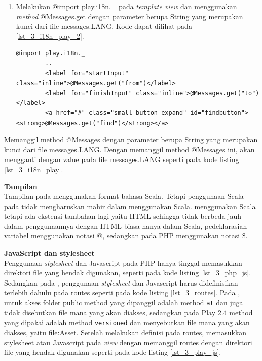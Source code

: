 \documentclass[a4paper,twoside]{article}
\begin{document}
\begin{enumerate}
\begin{enumerate}
	
	\item Melakukan @import play.i18n.\_ pada \textit{template view} dan menggunakan \textit{method} @Messages.get dengan parameter berupa String yang merupakan kunci dari file messages.LANG. Kode dapat dilihat pada \ref{lst_3_i18n_play_2}.
	
		\begin{lstlisting}[caption=Script \play untuk Internationalization,label = {lst_3_i18n_play_2}]
		@import play.i18n._
		..
		<label for="startInput" class="inline">@Messages.get("from")</label>
		<label for="finishInput" class="inline">@Messages.get("to")</label>
		<a href="#" class="small button expand" id="findbutton"><strong>@Messages.get("find")</strong></a>
	\end{lstlisting}
	
\end{enumerate}

Memanggil method @Messages dengan parameter berupa String yang merupakan kunci dari file messages.LANG. Dengan memanggil method @Messages ini, akan mengganti dengan value pada file messages.LANG seperti pada kode listing \ref{lst_3_i18n_play}.

\textbf{Tampilan}\\
Tampilan pada \play menggunakan format bahasa Scala. Tetapi penggunaan Scala pada \play tidak mengharuskan mahir dalam menggunakan Scala. \play menggunakan Scala tetapi ada ekstensi tambahan lagi yaitu HTML sehingga tidak berbeda jauh dalam penggunaannya dengan HTML biasa hanya dalam Scala, pedeklarasian variabel menggunakan notasi @, sedangkan pada PHP menggunakan notasi \$.

\textbf{JavaScript dan stylesheet}\\
Penggunaan \textit{stylesheet} dan Javascript pada PHP hanya tinggal memasukkan direktori file yang hendak digunakan, seperti pada kode listing \ref{lst_3_php_js}. Sedangkan pada \play, penggunaan \textit{stylesheet} dan Javascript harus didefinisikan terlebih dahulu pada routes seperti pada kode listing \ref{lst_3_routes}. Pada \cite{playforjava}, untuk akses folder public method yang dipanggil adalah method \verb!at! dan juga tidak disebutkan file mana yang akan diakses, sedangkan pada Play 2.4 method yang dipakai adalah method \verb!versioned! dan menyebutkan file mana yang akan diakses, yaitu file:Asset. Setelah melakukan definisi pada routes, memasukkan stylesheet atau Javascript pada \textit{view} dengan memanggil routes dengan direktori file yang hendak digunakan seperti pada kode listing \ref{lst_3_play_js}. 


\end{enumerate}
\end{document}
